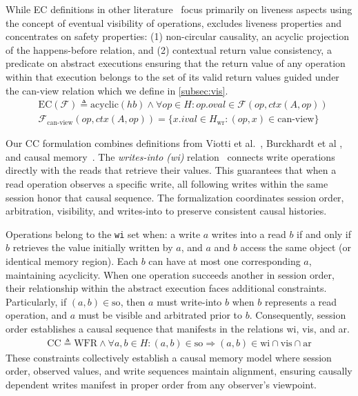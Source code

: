   While EC definitions in other literature~\cite{terry1994session,
  eventual, viotti2016consistency}
  focus primarily on liveness aspects using the concept of
  eventual visibility of operations,
  \sysname{} excludes liveness properties and concentrates on safety
  properties:
  (1) non-circular causality, an acyclic projection of the happens-before
  relation,
  and (2) contextual return value consistency, a predicate on abstract
  executions ensuring that the return value of any operation within
  that execution belongs to the set of its valid return values
  guided under the can-view relation which we define in \cref{subsec:vis}.
  \begin{align*}
    &\text{EC}(\mathcal{F}) \triangleq \text{acyclic}(hb) \land \forall
    op \in H: op.oval \in \mathcal{F}(op, ctx(A, op)) \\
    &\mathcal{F}_{\text{can-view}}(op, ctx(A, op)) = \{x.ival \in
    H_\text{wr} : (op, x) \in \text{can-view}\}
  \end{align*}

  Our CC formulation combines definitions from Viotti et
  al.~\cite{viotti2016consistency}, Burckhardt et al
  \cite{burckhardt2014principles}, and causal
  memory~\cite{baldoni2002an}. The \textit{writes-into (wi)}
  relation~\cite{baldoni2002an} connects write operations directly with the
  reads that retrieve their values. This guarantees that when
  a read operation observes a specific write, all following writes
  within the same session honor that causal sequence. The formalization
  coordinates session order, arbitration, visibility, and writes-into to
  preserve consistent causal histories.

  Operations belong to the \texttt{wi} set when: a write $a$
  writes into a read $b$ if and only if $b$ retrieves the value
  initially written
  by $a$, and $a$ and $b$ access the same object (or identical memory region).
  Each $b$ can have at most one corresponding $a$, maintaining acyclicity.
  When one operation succeeds another in session order, their
  relationship within the abstract execution faces additional constraints.
  Particularly, if $(a, b) \in \text{so}$, then $a$ must write-into $b$ when
  $b$ represents a read operation, and $a$ must be visible and
  arbitrated prior to $b$. Consequently, session order establishes a causal
  sequence that manifests in the relations wi, vis, and ar.
  \begin{eqnarray*}
    \text{CC} \triangleq \text{WFR} \land \forall a, b \in H: (a, b) \in
    \text{so} \Rightarrow (a, b) \in \text{wi} \cap \text{vis} \cap \text{ar}
  \end{eqnarray*}
  These constraints collectively establish a causal memory model where
  session order, observed values, and write sequences maintain
  alignment, ensuring
  causally dependent writes manifest in proper order from any
  observer's viewpoint.

